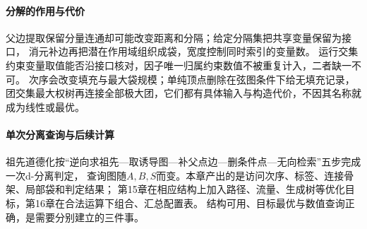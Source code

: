 \paragraph{分解的作用与代价}
父边提取保留分量连通却可能改变距离和分隔；给定分隔集把共享变量保留为接口，
消元补边再把潜在作用域组织成袋，宽度控制同时索引的变量数。
运行交集约束变量取值能否沿接口核对，因子唯一归属约束数值不被重复计入，二者缺一不可。
次序会改变填充与最大袋规模；单纯顶点删除在弦图条件下给无填充记录，
团交集最大权树再连接全部极大团，它们都有具体输入与构造代价，不因其名称就成为线性或最优。

\paragraph{单次分离查询与后续计算}
祖先道德化按“逆向求祖先—取诱导图—补父点边—删条件点—无向检索”五步完成一次d-分离判定，
查询图随$A,B,S$而变。本章产出的是访问次序、标签、连接骨架、局部袋和判定结果；
第15章在相应结构上加入路径、流量、生成树等优化目标，第16章在合法运算下组合、汇总配置表。
结构可用、目标最优与数值查询正确，是需要分别建立的三件事。
